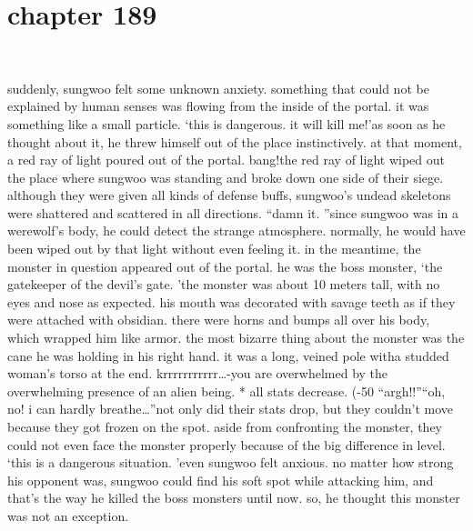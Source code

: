 \section{chapter 189}

                             




suddenly, sungwoo felt some unknown anxiety.
 something that could not be explained by human senses was flowing from the inside of the portal.
 it was something like a small particle.
‘this is dangerous.
 it will kill me!’as soon as he thought about it, he threw himself out of the place instinctively.
 at that moment, a red ray of light poured out of the portal.
bang!the red ray of light wiped out the place where sungwoo was standing and broke down one side of their siege.
although they were given all kinds of defense buffs, sungwoo’s undead skeletons were shattered and scattered in all directions.
“damn it.
”since sungwoo was in a werewolf’s body, he could detect the strange atmosphere.
normally, he would have been wiped out by that light without even feeling it.
in the meantime, the monster in question appeared out of the portal.
he was the boss monster, ‘the gatekeeper of the devil’s gate.
’the monster was about 10 meters tall, with no eyes and nose as expected.
 his mouth was decorated with savage teeth as if they were attached with obsidian.
 there were horns and bumps all over his body, which wrapped him like armor.
the most bizarre thing about the monster was the cane he was holding in his right hand.
 it was a long, veined pole witha studded woman’s torso at the end.
krrrrrrrrrrr…-you are overwhelmed by the overwhelming presence of an alien being.
* all stats decrease.
 (-50%
“argh!!”“oh, no! i can hardly breathe…”not only did their stats drop, but they couldn’t move because they got frozen on the spot.
 aside from confronting the monster, they could not even face the monster properly because of the big difference in level.
‘this is a dangerous situation.
’even sungwoo felt anxious.
 no matter how strong his opponent was, sungwoo could find his soft spot while attacking him, and that’s the way he killed the boss monsters until now.
 so, he thought this monster was not an exception.


